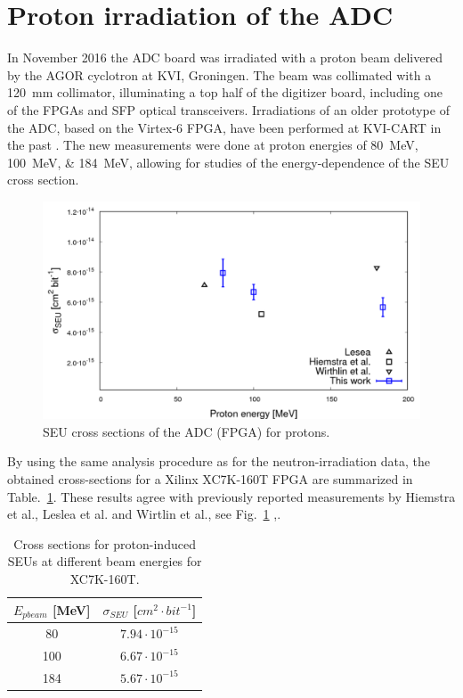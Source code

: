 \documentclass[12pt,a4paper, twocolumn]{article}
\newcommand{\Reffig}[1]{Fig.~\ref{#1}}
\newcommand{\Reftbl}[1]{Table.~\ref{#1}}
\begin{document}
\section{Proton irradiation of the ADC}
In November 2016 the ADC board was irradiated with a proton beam delivered by the AGOR cyclotron at KVI, Groningen. The beam was collimated with a \SI{120}{\milli\meter} collimator, illuminating a top half of the digitizer board, including one of the FPGAs and SFP optical transceivers. 
Irradiations of an older prototype of the ADC, based on the Virtex-6 FPGA, have been performed at KVI-CART in the past \cite{kava2}. The new measurements were done at proton energies of \SIlist{80; 100; 184}{\mega\electronvolt}, allowing for studies of the energy-dependence of the SEU cross section. 

\begin{figure}[htb]
\includegraphics[width=\linewidth, trim={0 0 0 0}, clip]{fig/ADCcssproton.pdf}
\caption{\label{fig:sadc:cssproton}SEU cross sections of the ADC (FPGA) for protons.}
\end{figure}
By using the same analysis procedure as for the neutron-irradiation data, the obtained cross-sections for a Xilinx XC7K-160T FPGA are summarized in \Reftbl{tab:Crss}. These results agree with previously reported measurements by Hiemstra et al., Leslea et al. and Wirtlin et al., see \Reffig{fig:sadc:cssproton} \cite{tale},\cite{kintex}. 
\begin{table}[htb]
\caption{\label{tab:Crss}Cross sections for proton-induced SEUs at different beam energies for XC7K-160T.}
\begin{center}
	\begin{tabular}{c|c}
	$E_{pbeam}$ [MeV]&$\sigma_{SEU}$ [$cm^2\cdot bit ^{-1}$] \\ \hline
	80 & $7.94\cdot10^{-15}$ \\ \hline
	100 & $6.67\cdot10^{-15}$ \\ \hline
	184 & $5.67\cdot10^{-15}$ \\ \hline
	\end{tabular}
\end{center}
\end{table}
\end{document}
